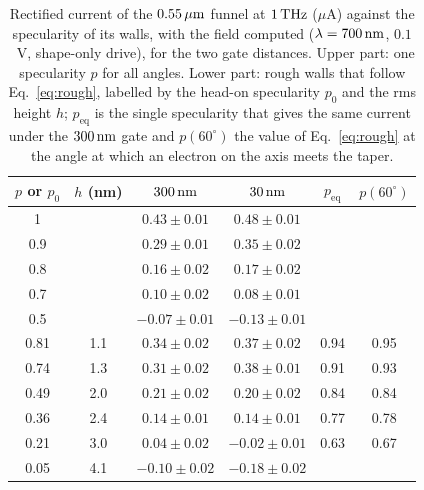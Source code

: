\begin{table}
\caption{Rectified current of the $0.55\,\mu\mathrm{m}$ funnel at $1\,\mathrm{THz}$ ($\mu$A)
against the specularity of its walls, with the field computed
($\lambda=700\,\mathrm{nm}$, $0.1$~V, shape-only drive), for the two gate
distances. Upper part: one specularity $p$ for all angles. Lower part:
rough walls that follow Eq.~\eqref{eq:rough}, labelled by the head-on
specularity $p_{0}$ and the rms height $h$; $p_{\mathrm{eq}}$ is the
single specularity that gives the same current under the $300\,\mathrm{nm}$ gate
and $p(60^{\circ})$ the value of Eq.~\eqref{eq:rough} at the angle at
which an electron on the axis meets the taper.}
\label{tab:edges}
\begin{ruledtabular}
\begin{tabular}{cccccc}
$p$ or $p_{0}$ & $h$ (nm) & $300\,\mathrm{nm}$ & $30\,\mathrm{nm}$ & $p_{\mathrm{eq}}$ & $p(60^{\circ})$ \\
\hline
1 & & $0.43\pm0.01$ & $0.48\pm0.01$ & & \\
0.9 & & $0.29\pm0.01$ & $0.35\pm0.02$ & & \\
0.8 & & $0.16\pm0.02$ & $0.17\pm0.02$ & & \\
0.7 & & $0.10\pm0.02$ & $0.08\pm0.01$ & & \\
0.5 & & $-0.07\pm0.01$ & $-0.13\pm0.01$ & & \\
\hline
0.81 & 1.1 & $0.34\pm0.02$ & $0.37\pm0.02$ & 0.94 & 0.95 \\
0.74 & 1.3 & $0.31\pm0.02$ & $0.38\pm0.01$ & 0.91 & 0.93 \\
0.49 & 2.0 & $0.21\pm0.02$ & $0.20\pm0.02$ & 0.84 & 0.84 \\
0.36 & 2.4 & $0.14\pm0.01$ & $0.14\pm0.01$ & 0.77 & 0.78 \\
0.21 & 3.0 & $0.04\pm0.02$ & $-0.02\pm0.01$ & 0.63 & 0.67 \\
0.05 & 4.1 & $-0.10\pm0.02$ & $-0.18\pm0.02$ & & \\
\end{tabular}
\end{ruledtabular}
\end{table}

